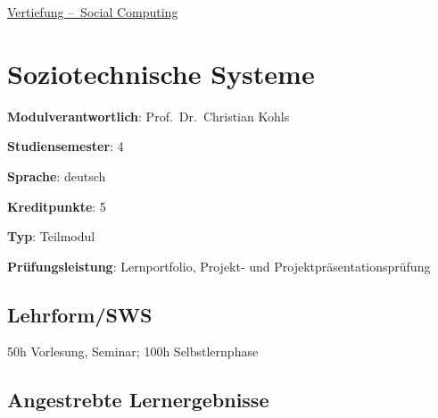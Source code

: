 \hyperref[/mi-2017/modulbeschreibungen-bachelor/BA_Vertiefung_SocialComputing]{Vertiefung – Social Computing}

\hypertarget{soziotechnische-systemepathlabelmi-2017modulbeschreibungen-bachelorba_sc_soziotechnische-systeme}{%
\chapter{Soziotechnische
Systeme\label{/mi-2017/modulbeschreibungen-bachelor/BA_SC_soziotechnische-systeme}}\label{soziotechnische-systemepathlabelmi-2017modulbeschreibungen-bachelorba_sc_soziotechnische-systeme}}

\begin{modulHead}
\textbf{Modulverantwortlich}: Prof.~Dr.~Christian
Kohls
\end{modulHead}
\begin{modulHead}
\textbf{Studiensemester}:
4
\end{modulHead}
\begin{modulHead}
\textbf{Sprache}:
deutsch
\end{modulHead}
\begin{modulHead}
\textbf{Kreditpunkte}:
5
\end{modulHead}
\begin{modulHead}
\textbf{Typ}:
Teilmodul
\end{modulHead}
\begin{modulHead}
\textbf{Prüfungsleistung}:
Lernportfolio, Projekt- und Projektpräsentationsprüfung
\end{modulHead}


\hypertarget{lehrformswspathlabelmi-2017modulbeschreibungen-bachelorba_sc_soziotechnische-systeme}{%
\section*{Lehrform/SWS\label{/mi-2017/modulbeschreibungen-bachelor/BA_SC_soziotechnische-systeme}}\label{lehrformswspathlabelmi-2017modulbeschreibungen-bachelorba_sc_soziotechnische-systeme}}

50h Vorlesung, Seminar; 100h Selbstlernphase

\hypertarget{angestrebte-lernergebnissepathlabelmi-2017modulbeschreibungen-bachelorba_sc_soziotechnische-systeme}{%
\section*{Angestrebte
Lernergebnisse\label{/mi-2017/modulbeschreibungen-bachelor/BA_SC_soziotechnische-systeme}}\label{angestrebte-lernergebnissepathlabelmi-2017modulbeschreibungen-bachelorba_sc_soziotechnische-systeme}}

